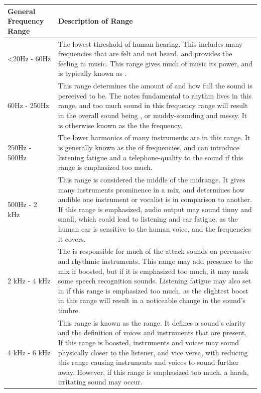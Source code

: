 \begin{table}
	\begin{tabular}{|p{20em} | p{25em}|}
		\hline
		General Frequency Range & Description of Range \\ 
		\hline
		<20Hz - 60Hz & The lowest threshold of human hearing. This includes many frequencies that are felt and not heard, and provides the \say{rumble} feeling in music. This range gives much of music its power, and is typically known as \say{sub-bass}. \\
		\hline
		60Hz - 250Hz & This range determines the amount of \say{warmth} and how full the sound is perceived to be. The notes fundamental to rhythm lives in this range, and too much sound in this frequency range will result in the overall sound being \say{boomy}, or muddy-sounding and messy. It is otherwise known as the the \say{bass} frequency. \\
		\hline
		250Hz - 500Hz & The lower harmonics of many instruments are in this range. It is generally known as the \say{lower midrange} of frequencies, and can introduce listening fatigue and a telephone-quality to the sound if this range is emphasized too much. \\
		\hline
		500Hz - 2 kHz & This range is considered the middle of the midrange. It gives many instruments prominence in a mix, and determines how audible one instrument or vocalist is in comparison to another. If this range is emphasized, audio output may sound tinny and small, which could lead to listening and ear fatigue, as the human ear is sensitive to the human voice, and the frequencies it covers. \\
		\hline
		2 kHz - 4 kHz & The \say{upper midrange} is responsible for much of the attack sounds on percussive and rhythmic instruments. This range may add presence to the mix if boosted, but if it is emphasized too much, it may mask some speech recognition sounds. Listening fatigue may also set in if this range is emphasized too much, as the slightest boost in this range will result in a noticeable change in the sound's timbre. \\
		\hline
		4 kHz - 6 kHz & This range is known as the \say{presence} range. It defines a sound's clarity and the definition of voices and instruments that are present. If this range is boosted, instruments and voices may sound physically closer to the listener, and vice versa, with reducing this range causing instruments and voices to sound further away. However, if this range is emphasized too much, a harsh, irritating sound may occur. \\

\end{tabular}
\end{table}
